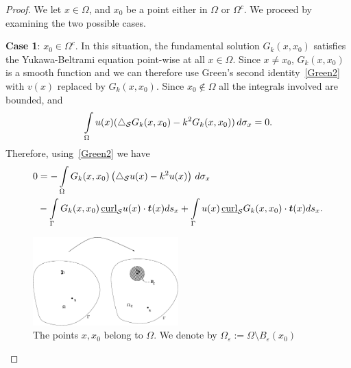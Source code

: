 \begin{proof} 
We let $x\in \Omega$, and $x_0$ be a point either in $\Omega$ or
$\Omega^c$.  We proceed by examining the two possible cases.

{\bf Case 1}:  $x_{0} \in \Omega^{c}$.  In this situation, the
fundamental solution $G_{k}(x,x_{0})$ satisfies the Yukawa-Beltrami
equation point-wise at all $x\in \Omega$. Since $x \neq x_0$,
$G_{k}(x,x_0)$ is a smooth function and we can therefore use Green's
second identity~\eqref{Green2} with $v(x)$ replaced by
$G_{k}(x,x_{0})$. Since $x_0\not \in \Omega$ all the
integrals involved are bounded, and 
\begin{align*}
  \int\limits_{\Omega} u(x)(\bigtriangleup_{\mathcal{S}}G_{k}(x,x_0) 
      -k^{2}G_{k}(x,x_0)) \, d\sigma_x=0.
\end{align*}
Therefore, using~\eqref{Green2} we have 
\begin{align*}
 0 &= - \int\limits_{\Omega}
    G_k(x,x_{0})\left(\lap_{\S}u(x) -k^2 u(x)\right)\,d\sigma_x \\
    &-\int\limits_{{\Gamma}} G_k(x,x_{0}) \, \underline{\mbox{curl}}_{\S}
    u(x) \cdot \vec{t}(x) ds_{x} 
 + \int\limits_{{\Gamma}}  u(x)
 \,\underline{\mbox{curl}}_{{\S}} G_k(x,x_0) \cdot \vec{t}(x) ds_{x}.
\end{align*}
\begin{figure}
  \centering
  \includegraphics[width=0.5\textwidth]{proof1}
  \caption{\label{f:proof1} The points $x,x_0$ belong to $\Omega$. We
  denote by $\Omega_\varepsilon:=\Omega\setminus B_{\varepsilon}(x_0)$}
\end{figure}


\end{proof}
